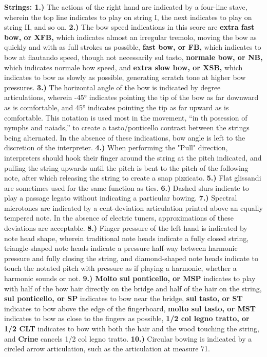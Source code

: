 \documentclass[11pt]{article}
\begin{document}
\begingroup
\begin{center}
\textbf{Strings: 1.)} The actions of the right hand are indicated by a four-line stave, wherein the top line indicates to play on string I, the next indicates to play on string II, and so on. \textbf{2.)} The bow speed indications in this score are \textbf{extra fast bow, or XFB,} which indicates almost an irregular tremolo, moving the bow as quickly and with as full strokes as possible,  \textbf{fast bow, or FB,} which indicates to bow at flautando speed, though not necessarily sul tasto, \textbf{normale bow, or NB,}  which indicates normale bow speed, and \textbf{extra slow bow, or XSB,} which indicates to bow as slowly as possible, generating scratch tone at higher bow pressures. \textbf{3.)}  The horizontal angle of the bow is indicated by degree articulations, wherein -45° indicates pointing the tip of the bow as far downward as is comfortable, and 45° indicates pointing the tip as far upward as is comfortable. This notation is used most in the movement, ``in th posession of nymphs and naiads,'' to create a tasto/ponticello contrast between the strings being alternated. In the absence of these indications, bow angle is left to the discretion of the interpreter. \textbf{4.)} When performing the "Pull" direction, interpreters should hook their finger around the string at the pitch indicated, and pulling the string upwards until the pitch is bent to the pitch of the following note, after which releasing the string to create a snap pizzicato. \textbf{5.)} Flat glissandi are sometimes used for the same function as ties. \textbf{6.)} Dashed slurs indicate to play a passage legato without indicating a particular bowing. \textbf{7.)} Spectral microtones are indicated by a cent-deviation articulation printed above an equally tempered note. In the absence of electric tuners, approximations of these deviations are acceptable. \textbf{8.)} Finger pressure of the left hand is indicated by note head shape, wherein traditional note heads indicate a fully closed string, triangle-shaped note heads indicate a pressure half-way between harmonic pressure and fully closing the string, and diamond-shaped note heads indicate to touch the notated pitch with pressure as if playing a harmonic, whether a harmonic sounds or not. \textbf{9.) Molto sul ponticello, or MSP} indicates to play with half of the bow hair directly on the bridge and half of the hair on the string, \textbf{sul ponticello, or SP} indicates to bow near the bridge, \textbf{sul tasto, or ST} indicates to bow above the edge of the fingerboard, \textbf{molto sul tasto, or MST} indicates to bow as close to the fingers as possible, \textbf{1/2 col legno tratto, or 1/2 CLT} indicates to bow with both the hair and the wood touching the string, and \textbf{Crine} cancels 1/2 col legno tratto. \textbf{10.)} Circular bowing is indicated by a circled arrow articulation, such as the articulation at measure 71. \\
\rightskip\leftskip
\end{center}
\endgroup
\end{document}
